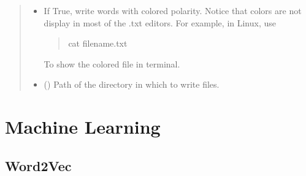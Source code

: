 \documentclass[letterpaper,10pt,english]{sphinxmanual}
\begin{document}
\begin{fulllineitems}
\begin{quote}
\begin{description}
\begin{itemize}
\item {} 
 \textendash{} 
If True, write words with colored polarity. Notice that colors are not display in most of the .txt editors.
For example, in Linux, use
\begin{quote}

%
\begin{sphinxVerbatim}[commandchars=\\\{\}]
cat file\PYGZus{}name.txt
\end{sphinxVerbatim}
\end{quote}

To show the colored file in terminal.


\item {} 
 () \textendash{} Path of the directory in which to write files.

\end{itemize}

\end{description}\end{quote}

\end{fulllineitems}



\chapter{Machine Learning}
\label{\detokenize{learning:machine-learning}}\label{\detokenize{learning::doc}}

\section{Word2Vec}
\label{\detokenize{learning:module-loacore.learning.word2vec}}\label{\detokenize{learning:word2vec}}
\end{document}
